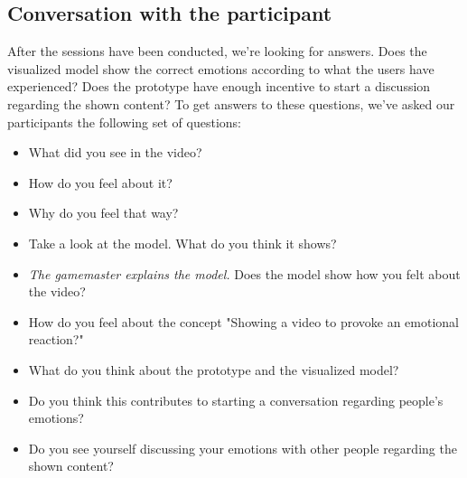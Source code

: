 \documentclass[sigconf]{acmart}
\begin{document}
\subsection{Conversation with the participant}
After the sessions have been conducted, we’re looking for answers. Does the visualized model show the
correct emotions according to what the users have experienced? Does the prototype have enough incentive to start
a discussion regarding the shown content? To get answers to these questions, we've asked our participants
the following set of questions:
\begin{itemize}
    \item{What did you see in the video?}
    \item{How do you feel about it?}
    \item{Why do you feel that way?}
    \item{Take a look at the model. What do you think it shows?}
    \item{\emph{The gamemaster explains the model.} Does the model show how you felt about the video?}
    \item{How do you feel about the concept "Showing a video to provoke an emotional reaction?"}
    \item{What do you think about the prototype and the visualized model?}
    \item{Do you think this contributes to starting a conversation regarding people's emotions?}
    \item{Do you see yourself discussing your emotions with other people regarding the shown content?}
\end{itemize}


\end{document}

